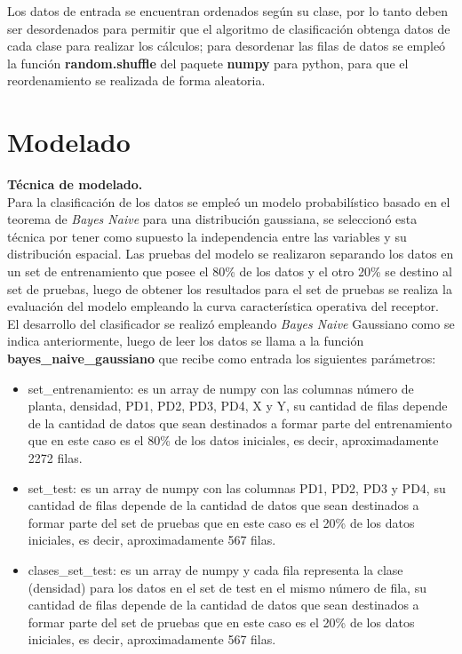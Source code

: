 Los datos de entrada se encuentran ordenados según su clase, por lo tanto deben ser desordenados para permitir que el algoritmo de clasificación obtenga datos de cada clase para realizar los cálculos; para desordenar las filas de datos se empleó la función \textbf{random.shuffle} del paquete \textbf{numpy} para python, para que el reordenamiento se realizada de forma aleatoria.\\

\section{Modelado}

\noindent
\textbf{Técnica de modelado.}\\

Para la clasificación de los datos se empleó un modelo probabilístico basado en el teorema de \textit{Bayes Naive}  para una distribución
gaussiana, se seleccionó esta técnica por tener como supuesto la independencia entre las variables y su distribución
espacial. Las pruebas del modelo se realizaron separando los datos en un set de entrenamiento que posee el 80\% de los
datos y el otro 20\% se destino al set de pruebas, luego de obtener los resultados para el set de pruebas se realiza la
evaluación del modelo empleando la curva característica operativa del receptor.\\

El desarrollo del clasificador se realizó empleando \textit{Bayes Naive} Gaussiano como se indica anteriormente, luego de leer los datos se llama a la función
\textbf{bayes\_naive\_gaussiano} que recibe como entrada los siguientes parámetros:
\begin{itemize}
	\item{set\_entrenamiento: es un array de numpy con las columnas número de planta, densidad, PD1, PD2, PD3, PD4, X y Y, su
	cantidad de filas depende de la cantidad de datos que sean destinados a formar parte del entrenamiento que en este caso es
	el 80\% de los datos iniciales, es decir, aproximadamente 2272 filas.}
	\item{set\_test: es un array de numpy con las columnas PD1, PD2, PD3 y PD4, su cantidad de filas depende de la cantidad de
	datos que sean destinados a formar parte del set de pruebas que en este caso es el 20\% de los datos iniciales, es decir,
	aproximadamente 567 filas.}
	\item{clases\_set\_test: es un array de numpy y cada fila representa la clase (densidad) para los datos en el set de test
	en el mismo número de fila, su cantidad de filas depende de la cantidad de datos que sean destinados a formar parte del set
	de pruebas que en este caso es el 20\% de los datos iniciales, es decir, aproximadamente 567 filas.\\}
\end{itemize}

